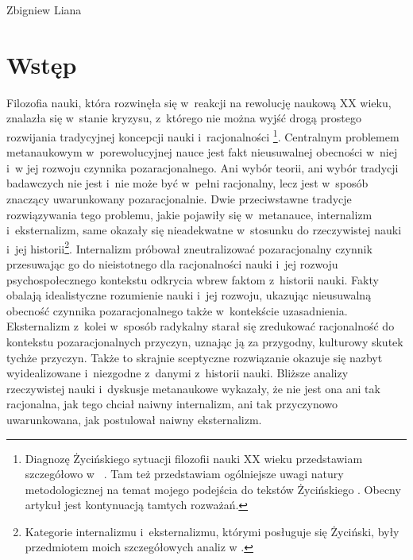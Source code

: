 \begin{artplenv}{Zbigniew Liana}
\section{Wstęp}
\lettrine[loversize=0.13,lines=2,lraise=-0.01,nindent=0em,findent=0.2pt]%
{F}{}ilozofia nauki, która rozwinęła się w~reakcji na rewolucję naukową XX wieku, znalazła się w~stanie kryzysu, z~którego nie można wyjść drogą prostego rozwijania tradycyjnej koncepcji nauki i~racjonalności
\parencites[][s.~199]{zycinski_teizm_1985}[][s.~145]{zycinski_structure_1988}[][s.~189]{zycinski_elementy_1996}%
\footnote{Diagnozę Życińskiego sytuacji filozofii nauki XX wieku przedstawiam szczegółowo w~
\parencite[][]{liana_nauka_2019_liana}. %
 Tam też przedstawiam ogólniejsze uwagi natury metodologicznej na temat mojego podejścia do tekstów Życińskiego 
\parencite[][s.~148–152]{liana_nauka_2019_liana}. %
 Obecny artykuł jest kontynuacją tamtych rozważań.}. Centralnym problemem metanaukowym w~porewolucyjnej nauce jest fakt nieusuwalnej obecności w~niej i~w jej rozwoju czynnika pozaracjonalnego. Ani wybór teorii, ani wybór tradycji badawczych nie jest i~nie może być w~pełni racjonalny, lecz jest w~sposób znaczący uwarunkowany pozaracjonalnie. Dwie przeciwstawne tradycje rozwiązywania tego problemu, jakie pojawiły się w~metanauce, internalizm i~eksternalizm, same okazały się nieadekwatne w~stosunku do rzeczywistej nauki i~jej historii\footnote{Kategorie internalizmu i~eksternalizmu, którymi posługuje się Życiński, były przedmiotem moich szczegółowych analiz w
\parencite[][]{liana_nauka_2019_liana}.%
}. Internalizm próbował zneutralizować pozaracjonalny czynnik przesuwając go do nieistotnego dla racjonalności nauki i~jej rozwoju psychospołecznego kontekstu odkrycia wbrew faktom z~historii nauki. Fakty obalają idealistyczne rozumienie nauki i~jej rozwoju, ukazując nieusuwalną obecność czynnika pozaracjonalnego także w~kontekście uzasadnienia. Eksternalizm z~kolei w~sposób radykalny starał się zredukować racjonalność do kontekstu pozaracjonalnych przyczyn, uznając ją za przygodny, kulturowy skutek tychże przyczyn. Także to skrajnie sceptyczne rozwiązanie okazuje się nazbyt wyidealizowane i~niezgodne z~danymi z~historii nauki. Bliższe analizy rzeczywistej nauki i~dyskusje metanaukowe wykazały, że nie jest ona ani tak racjonalna, jak tego chciał naiwny internalizm, ani tak przyczynowo uwarunkowana, jak postulował naiwny eksternalizm.


\end{artplenv}
